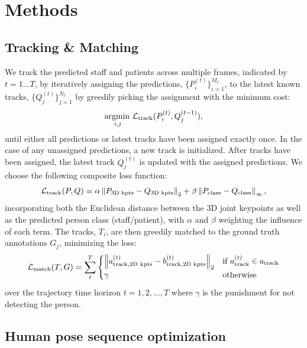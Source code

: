 \chapter{Methods}

\section{Tracking \& Matching}
We track the predicted staff and patients across multiple frames, indicated by $t = 1 \ldots T$, by iteratively assigning the predictions, $\{ P_i^{(t)} \}_{i=1}^{M_t}$, to the latest known tracks, $\{ Q^{(t)}_{j} \}_{j=1}^{N_t}$ by greedily picking the assignment with the minimum cost:
\begin{equation}
    \operatorname*{argmin\,}_{i,j} \mathcal{L}_\text{track}(P^{(t)}_i, Q^{(t-1)}_j),
\end{equation}
until either all predictions or latest tracks have been assigned exactly once. In the case of any unassigned predictions, a new track is initialized. After tracks have been assigned, the latest track $Q^{(t)}_j$ is updated with the assigned predictions. We choose the following composite loss function:
\begin{equation}
    \mathcal{L}_\text{track}(P, Q) = \alpha \left \lVert P_\text{3D kpts} - Q_\text{3D kpts} \right \rVert_{2} + \beta \left \lVert P_\text{class} - Q_\text{class} \right \rVert_{\infty},
\end{equation}
incorporating both the Euclidean distance between the 3D joint keypoints as well as the predicted person class (staff/patient), with $\alpha$ and $\beta$ weighting the influence of each term. The tracks, $T_i$, are then greedily matched to the ground truth annotations $G_j$, minimizing the loss:
\begin{equation}
    \mathcal{L}_\text{match}(T, G) = \sum_t^{T} \begin{cases}
        \norm{a^{(t)}_{\text{track}, \text{2D kpts}} - b^{(t)}_{\text{track}, \text{2D kpts}}}{2} & \text{if}\ a^{(t)}_\text{track} \in a_\text{track} \\
        \gamma & \text{otherwise}
    \end{cases}
\end{equation}
over the trajectory time horizon $t = 1,2,\ldots,T$ where $\gamma$ is the punishment for not detecting the person.

\section{Human pose sequence optimization}

